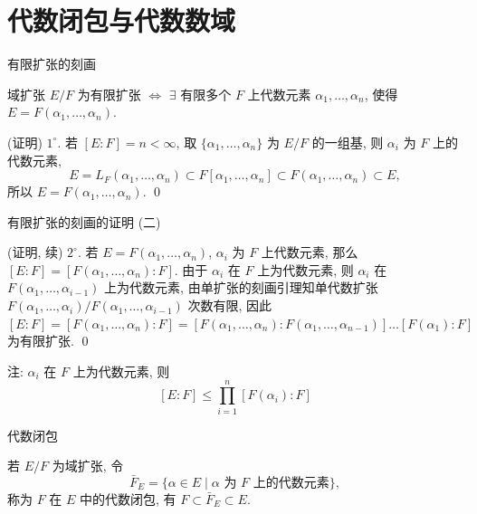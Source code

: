 
\section[闭包]{代数闭包与代数数域}


\begin{frame}{有限扩张的刻画}

\begin{lem}[有限扩张的刻画]
域扩张 $E/F$ 为有限扩张 $\iff$ $\exists$ 有限多个 $F$ 上代数元素
$\alpha_1, \dots, \alpha_n$, 使得 $E = F(\alpha_1, \dots, \alpha_n)$.
\end{lem}

\startproof[bg=yellow, fg=red](证明)
$1^{\circ}$. 若 $[E:F] = n < \infty$, 取 $\{ \alpha_1, \dots, \alpha_n \}$
为 $E/F$ 的一组基, 则 $\alpha_i$ 为 $F$ 上的代数元素,
\[
E = L_F(\alpha_1, \dots, \alpha_n) \subset F[\alpha_1, \dots, \alpha_n]
\subset F(\alpha_1, \dots, \alpha_n) \subset E,
\]
所以 $E = F(\alpha_1, \dots, \alpha_n)$.
\qed

\end{frame}


\begin{frame}{有限扩张的刻画的证明 (二)}

\startproof[bg=yellow, fg=red](证明, 续)
$2^{\circ}$. 若 $E = F(\alpha_1, \dots, \alpha_n)$, $\alpha_i$ 为 $F$ 上代数元素,
那么 $[E:F] = [F(\alpha_1, \dots, \alpha_n):F]$.
由于 $\alpha_i$ 在 $F$ 上为代数元素, 则 $\alpha_i$ 在
$F(\alpha_1, \dots, \alpha_{i-1})$ 上为代数元素,
由单扩张的刻画引理知单代数扩张
$F(\alpha_1, \dots, \alpha_i)/F(\alpha_1, \dots, \alpha_{i-1})$ 次数有限,
因此 $[E:F] = [F(\alpha_1, \dots, \alpha_n):F] =
[F(\alpha_1, \dots, \alpha_n):F(\alpha_1, \dots, \alpha_{n-1})] \dots [F(\alpha_1):F]$
为有限扩张.
\qed

\pause

注: $\alpha_i$ 在 $F$ 上为代数元素, 则
\[
[E:F] \leq \prod_{i=1}^{n} [F(\alpha_i):F]
\]

\end{frame}


\begin{frame}{代数闭包}

若 $E/F$ 为域扩张, 令
\[
\bar{F}_E = \{ \alpha \in E \mid \alpha \text{ 为 } F \text{ 上的代数元素} \},
\]
称为 $F$ 在 $E$ 中的代数闭包, 有 $F \subset \bar{F}_E \subset E$.

\end{frame}

